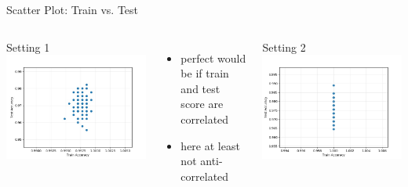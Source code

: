 \begin{frame}[c]{Scatter Plot: Train vs. Test}


\begin{columns}
	

\centering
Setting 1
\includegraphics[width=1\textwidth]{scripts/mlp1_test_train_scatter.jpg}

\begin{itemize}
	\item perfect would be if train and test score are correlated
	\item here at least not anti-correlated
\end{itemize}



\pause
\centering
Setting 2
\includegraphics[width=1\textwidth]{scripts/mlp2_test_train_scatter.jpg}
	

\end{columns}
\end{frame}
